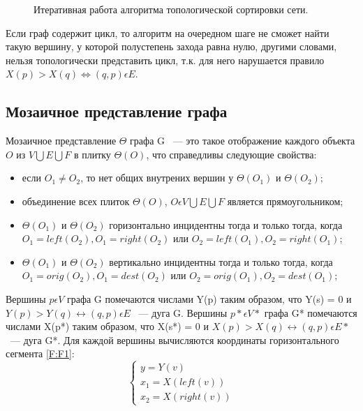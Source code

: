\begin{figure}
\begin{minipage}[H]{0.99\linewidth}
	\end{minipage}
	\caption{Итеративная работа алгоритма топологической сортировки сети.}
	\label{fig:fig8}
\end{figure}

Если граф содержит цикл, то алгоритм на очередном шаге не сможет найти такую вершину, у которой полустепень захода равна нулю, другими словами, нельзя топологически представить цикл, т.к. для него нарушается правило $ X(p) > X(q) \Leftrightarrow (q, p) \epsilon E $.

\subsection{Мозаичное представление графа}

Мозаичное представление $ \Theta $ графа G ~--- это такое отображение каждого объекта $ O $ из $ V \bigcup E \bigcup F $ в плитку $ \Theta(O) $, что справедливы следующие свойства:
\begin{itemize}
\item если $ O_{1} \neq O_{2} $, то нет общих внутрених вершин у $ \Theta(O_{1}) $ и $ \Theta(O_{2}) $;
\item объединение всех плиток $ \Theta(O) $, $ O \epsilon V \bigcup E \bigcup F $ является прямоугольником;
\item $ \Theta(O_{1}) $ и $ \Theta(O_{2}) $ горизонтально инцидентны тогда и только тогда, когда $ O_{1} = left(O_{2}) , O_{1} = right(O_{2}) $ или $ O_{2} = left(O_{1}) , O_{2} = right(O_{1}) $;
\item $ \Theta(O_{1}) $ и $ \Theta(O_{2}) $ вертикально инцидентны тогда и только тогда, когда $ O_{1} = orig(O_{2}) , O_{1} = dest(O_{2}) $ или $ O_{2} = orig(O_{1}) , O_{2} = dest(O_{1}) $;
\end{itemize}

Вершины $ p \epsilon V $ графа G помечаются числами Y(p) таким образом, что Y(s) = 0 и $ Y(p) > Y(q) \leftrightarrow (q, p) \epsilon E $ ~--- дуга G.
Вершины $ p* \epsilon V* $ графа G* помечаются числами X(p*) таким образом, что X(s*) = 0 и $ X(p) > X(q) \leftrightarrow (q, p) \epsilon E* $ ~--- дуга G*.
Для каждой вершины вычисляются координаты горизонтального сегмента \ref{F:F1}:
\begin{equation}
	\begin{cases}
	y = Y(v) \\
	x_{1} = X(left(v)) \\
	x_{2} = X(right(v))
	\end{cases}
\label{F:F1}
\end{equation}

